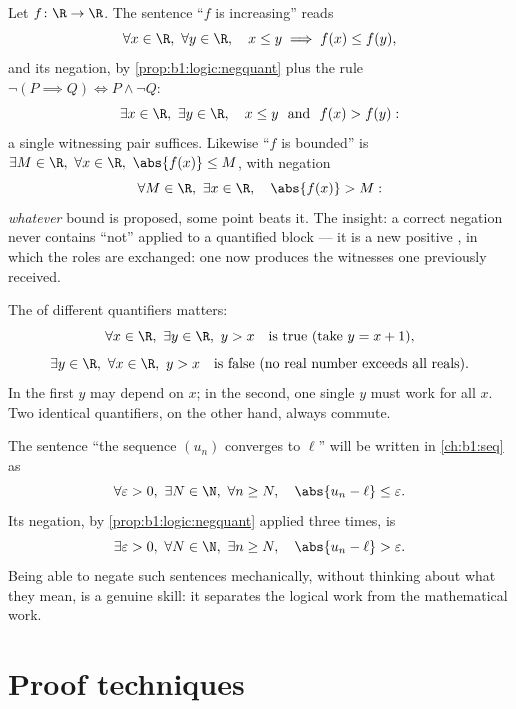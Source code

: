 \begin{example}\label{ex:b1:logic:negpractice}
Let $f \colon \R \to \R$. The sentence ``$f$ is increasing'' reads
\[
\forall x \in \R,\ \forall y \in \R,\quad
x \leq y \implies f(x) \leq f(y) ,
\]
and its negation, by \cref{prop:b1:logic:negquant} plus the rule
$\lnot(P \implies Q) \iff P \land \lnot Q$:
\[
\exists x \in \R,\ \exists y \in \R,\quad
x \leq y \ \text{ and }\ f(x) > f(y) :
\]
a single witnessing pair suffices. Likewise ``$f$ is bounded'' is
$\exists M \in \R,\ \forall x \in \R,\ \abs{f(x)} \leq M$, with
negation
\[
\forall M \in \R,\ \exists x \in \R,\quad \abs{f(x)} > M :
\]
\emph{whatever} bound is proposed, some point beats it. The
insight: a correct negation never contains ``not'' applied to a
quantified block --- it is a new positive , in which the
roles are exchanged: one now produces the witnesses one previously
received.
\end{example}

\begin{example}\label{ex:b1:logic:order}
The  of different quantifiers matters:
\[
\forall x \in \R,\ \exists y \in \R,\ y > x
\quad\text{is true (take } y = x+1\text{),}
\]
\[
\exists y \in \R,\ \forall x \in \R,\ y > x
\quad\text{is false (no real number exceeds all reals).}
\]
In the first  $y$ may depend on $x$; in the second, one single
$y$ must work for all $x$. Two identical quantifiers, on the other
hand, always commute.
\end{example}

\begin{example}\label{ex:b1:logic:limit}
The sentence ``the sequence $(u_n)$ converges to $\ell$'' will be
written in \cref{ch:b1:seq} as
\[
\forall \varepsilon > 0,\ \exists N \in \N,\ \forall n \geq N,\quad
\abs{u_n - \ell} \leq \varepsilon .
\]
Its negation, by \cref{prop:b1:logic:negquant} applied three times, is
\[
\exists \varepsilon > 0,\ \forall N \in \N,\ \exists n \geq N,\quad
\abs{u_n - \ell} > \varepsilon .
\]
Being able to negate such sentences mechanically, without thinking
about what they mean, is a genuine skill: it separates the logical work
from the mathematical work.
\end{example}

\section{Proof techniques}


